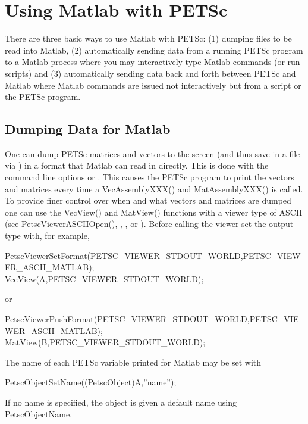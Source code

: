 \chapter{Using Matlab with PETSc}
\label{ch_matlab}

There are three basic ways to use Matlab with PETSc: (1) dumping files to 
be read into Matlab, (2) automatically sending data from a running PETSc program
to a Matlab process where you may interactively type Matlab commands (or run
scripts) and (3) automatically sending data back and forth between PETSc and 
Matlab where Matlab commands are issued not interactively but from a script or
the PETSc program.

\section{Dumping Data for Matlab}
One can dump PETSc matrices and vectors to the screen (and thus save in a file via
) in a format that Matlab can read in directly. This is done with the
command line options  or . This causes the PETSc program
to print the vectors and matrices every time a VecAssemblyXXX() and MatAssemblyXXX()
is called.   To provide finer control
over when and what vectors and matrices are dumped one can use the VecView() and 
MatView() functions with a viewer type of ASCII (see PetscViewerASCIIOpen(), 
, , or ). Before calling
the viewer set the output type with, for example, 
\begin{tabbing}
  PetscViewerSetFormat(PETSC_VIEWER_STDOUT_WORLD,PETSC\_VIEWER\_ASCII\_MATLAB);\\
  VecView(A,PETSC_VIEWER_STDOUT_WORLD);
\end{tabbing}
or 
\begin{tabbing}
  PetscViewerPushFormat(PETSC_VIEWER_STDOUT_WORLD,PETSC\_VIEWER\_ASCII\_MATLAB);\\
  MatView(B,PETSC_VIEWER_STDOUT_WORLD);
\end{tabbing}
The name of each PETSc variable printed for Matlab may be set with
\begin{tabbing}
PetscObjectSetName((PetscObject)A,''name'');
\end{tabbing}
If no name is specified, the object is given a default name using PetscObjectName.

